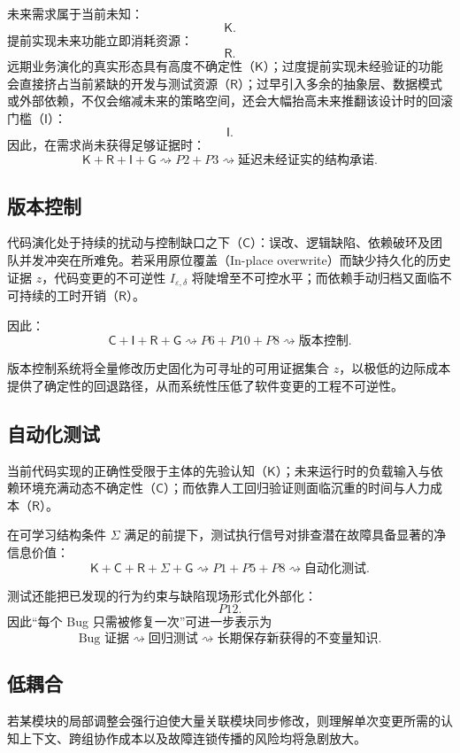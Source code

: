 \documentclass[11pt,a4paper]{ctexart}
\numberwithin{equation}{section}
\theoremstyle{definition}
\theoremstyle{plain}
\newcommand{\Know}{\mathsf{K}}
\newcommand{\Res}{\mathsf{R}}
\newcommand{\Ctrl}{\mathsf{C}}
\newcommand{\Info}{\mathsf{I}}
\newcommand{\Goal}{\mathsf{G}}
\newcommand{\Learn}{\Sigma}
\begin{document}
未来需求属于当前未知：
\[
\Know.
\]
提前实现未来功能立即消耗资源：
\[
\Res.
\]
远期业务演化的真实形态具有高度不确定性（$\Know$）；过度提前实现未经验证的功能会直接挤占当前紧缺的开发与测试资源（$\Res$）；过早引入多余的抽象层、数据模式或外部依赖，不仅会缩减未来的策略空间，还会大幅抬高未来推翻该设计时的回滚门槛（$\Info$）：
\[
\Info.
\]
因此，在需求尚未获得足够证据时：
\[
\Know+\Res+\Info+\Goal
\rightsquigarrow
P2+P3
\rightsquigarrow
\text{延迟未经证实的结构承诺}.
\]

\subsection{版本控制}

代码演化处于持续的扰动与控制缺口之下（$\Ctrl$）：误改、逻辑缺陷、依赖破环及团队并发冲突在所难免。若采用原位覆盖（In-place overwrite）而缺少持久化的历史证据 $z$，代码变更的不可逆性 $I_{\varepsilon,\delta}$ 将陡增至不可控水平；而依赖手动归档又面临不可持续的工时开销（$\Res$）。

因此：
\[
\Ctrl+\Info+\Res+\Goal
\rightsquigarrow
P6+P10+P8
\rightsquigarrow
\text{版本控制}.
\]

版本控制系统将全量修改历史固化为可寻址的可用证据集合 $z$，以极低的边际成本提供了确定性的回退路径，从而系统性压低了软件变更的工程不可逆性。

\subsection{自动化测试}

当前代码实现的正确性受限于主体的先验认知（$\Know$）；未来运行时的负载输入与依赖环境充满动态不确定性（$\Ctrl$）；而依靠人工回归验证则面临沉重的时间与人力成本（$\Res$）。

在可学习结构条件 $\Learn$ 满足的前提下，测试执行信号对排查潜在故障具备显著的净信息价值：
\[
\Know+\Ctrl+\Res+\Learn+\Goal
\rightsquigarrow
P1+P5+P8
\rightsquigarrow
\text{自动化测试}.
\]

测试还能把已发现的行为约束与缺陷现场形式化外部化：
\[
P12.
\]
因此“每个 Bug 只需被修复一次”可进一步表示为
\[
\text{Bug 证据}
\rightsquigarrow
\text{回归测试}
\rightsquigarrow
\text{长期保存新获得的不变量知识}.
\]

\subsection{低耦合}

若某模块的局部调整会强行迫使大量关联模块同步修改，则理解单次变更所需的认知上下文、跨组协作成本以及故障连锁传播的风险均将急剧放大。
\end{document}
